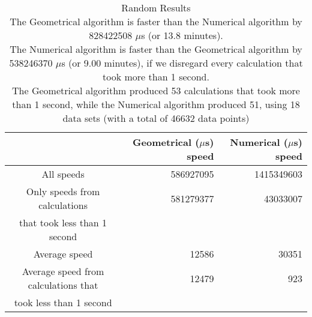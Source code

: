 \begin{table}[bth!]\footnotesize
 \begin{tabular}[3]{c|r|r}
 & Geometrical ($\mu$s) speed & Numerical ($\mu$s) speed\\
\hline
All speeds & 586927095 & 1415349603 \\ 
\hline 
Only speeds from calculations & 581279377 & 43033007 \\ 
that took less than 1 second & & \\ 
\hline
Average speed & 12586 & 30351 \\
\hline
Average speed from calculations that & 12479 & 923 \\ 
took less than 1 second & & \\ 
\end{tabular}\\ \\
\caption{Random  Results\\
The Geometrical algorithm is faster than the Numerical algorithm by 828422508 $\mu$s (or 13.8 minutes).\\
The Numerical algorithm is faster than the Geometrical algorithm by 538246370 $\mu$s (or 9.00 minutes), if we disregard every calculation that took more than 1 second.\\
The Geometrical algorithm produced 53 calculations that took more than 1 second, while the Numerical algorithm produced 51, using 18 data sets (with a total of 46632 data points)\\
}\label{total-random_speedtable}\end{table}